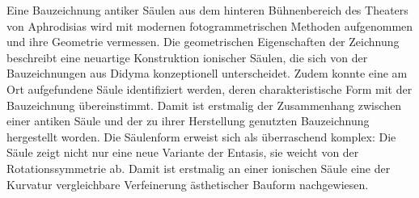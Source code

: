 \documentclass[twocolumn]{bmcart}
\begin{document}
\begin{frontmatter}
\begin{fmbox}
\begin{artnotes}
\end{artnotes}

\end{fmbox}%

\begin{abstractbox}
	
	\begin{abstract} %

	\end{abstract}
	
	
	\begin{keyword}
	\end{keyword}
	
	
\end{abstractbox}
%
Eine Bauzeichnung antiker Säulen aus dem  hinteren Bühnenbereich  des Theaters von Aphrodisias  wird mit modernen fotogrammetrischen Methoden aufgenommen und ihre Geometrie vermessen. Die geometrischen Eigenschaften der Zeichnung beschreibt eine neuartige Konstruktion ionischer Säulen, die sich von der Bauzeichnungen aus Didyma konzeptionell unterscheidet. Zudem konnte eine am Ort aufgefundene Säule identifiziert werden, deren charakteristische Form mit der Bauzeichnung  übereinstimmt. Damit ist erstmalig der Zusammenhang zwischen einer antiken Säule und der zu ihrer Herstellung genutzten Bauzeichnung hergestellt worden. Die Säulenform erweist sich als überraschend komplex: Die Säule zeigt nicht nur eine neue Variante der Entasis, sie weicht von der Rotationssymmetrie ab. Damit ist erstmalig an einer ionischen Säule eine der Kurvatur vergleichbare Verfeinerung ästhetischer Bauform nachgewiesen.

\end{frontmatter}
\end{document}
